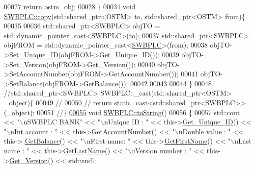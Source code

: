 \begin{DoxyCode}
00027     \textcolor{keywordflow}{return} ostm\_obj;
00028 \}
\hypertarget{_s_w_b_p_l_c_8cpp_source.tex_l00034}{}\hyperlink{class_s_w_b_p_l_c_a9468640482a6cfb9bfb4115fc59191d5_a9468640482a6cfb9bfb4115fc59191d5}{00034} \textcolor{keywordtype}{void} \hyperlink{class_s_w_b_p_l_c_a9468640482a6cfb9bfb4115fc59191d5_a9468640482a6cfb9bfb4115fc59191d5}{SWBPLC::copy}(std::shared\_ptr<OSTM> to, std::shared\_ptr<OSTM> from)\{
00035 
00036     std::shared\_ptr<SWBPLC> objTO = std::dynamic\_pointer\_cast<\hyperlink{class_s_w_b_p_l_c}{SWBPLC}>(to);
00037     std::shared\_ptr<SWBPLC> objFROM = std::dynamic\_pointer\_cast<\hyperlink{class_s_w_b_p_l_c}{SWBPLC}>(from);
00038     objTO->\hyperlink{class_o_s_t_m_ab5019a32185631c08abbf826422f2d93_ab5019a32185631c08abbf826422f2d93}{Set\_Unique\_ID}(objFROM->Get\_Unique\_ID());
00039     objTO->Set\_Version(objFROM->Get\_Version());
00040     objTO->SetAccountNumber(objFROM->GetAccountNumber());
00041     objTO->SetBalance(objFROM->GetBalance());
00042 
00043     
00044 \}
00048 \textcolor{comment}{//std::shared\_ptr<SWBPLC> SWBPLC::\_cast(std::shared\_ptr<OSTM> \_object)\{}
00049 \textcolor{comment}{//}
00050 \textcolor{comment}{//    return static\_cast<std::shared\_ptr<SWBPLC>>(\_object);}
00051 \textcolor{comment}{//\}}
\hypertarget{_s_w_b_p_l_c_8cpp_source.tex_l00055}{}\hyperlink{class_s_w_b_p_l_c_a761c77b5a204b4ae05ffb01bd602c3c2_a761c77b5a204b4ae05ffb01bd602c3c2}{00055} \textcolor{comment}{}\textcolor{keywordtype}{void} \hyperlink{class_s_w_b_p_l_c_a761c77b5a204b4ae05ffb01bd602c3c2_a761c77b5a204b4ae05ffb01bd602c3c2}{SWBPLC::toString}()
00056 \{
00057      std::cout << \textcolor{stringliteral}{"\(\backslash\)nSWBPLC BANK"} << \textcolor{stringliteral}{"\(\backslash\)nUnique ID : "} << this->\hyperlink{class_o_s_t_m_a5a01a8b98d16b1d1904ecf9356e7b71d_a5a01a8b98d16b1d1904ecf9356e7b71d}{Get\_Unique\_ID}() << \textcolor{stringliteral}{"\(\backslash\)nInt
       account : "} << this->\hyperlink{class_s_w_b_p_l_c_a1a997f6d333e5021970e50605431d7df_a1a997f6d333e5021970e50605431d7df}{GetAccountNumber}() << \textcolor{stringliteral}{"\(\backslash\)nDouble value : "} << this->
      \hyperlink{class_s_w_b_p_l_c_af7f5f662ab926bfb9c0c1c7156cde24c_af7f5f662ab926bfb9c0c1c7156cde24c}{GetBalance}() << \textcolor{stringliteral}{"\(\backslash\)nFirst name: "} << this->\hyperlink{class_s_w_b_p_l_c_ace6bbcd6546896e581e3a2ee9504d090_ace6bbcd6546896e581e3a2ee9504d090}{GetFirstName}() << \textcolor{stringliteral}{"\(\backslash\)nLast name : "} << 
      this->\hyperlink{class_s_w_b_p_l_c_a72b2595acea28dae9e4f5816dd3c4652_a72b2595acea28dae9e4f5816dd3c4652}{GetLastName}()  << \textcolor{stringliteral}{"\(\backslash\)nVersion number : "} << this->\hyperlink{class_o_s_t_m_a1f1db9d482f22c8e7caa17dfb340626b_a1f1db9d482f22c8e7caa17dfb340626b}{Get\_Version}() << std::endl;

\end{DoxyCode}

